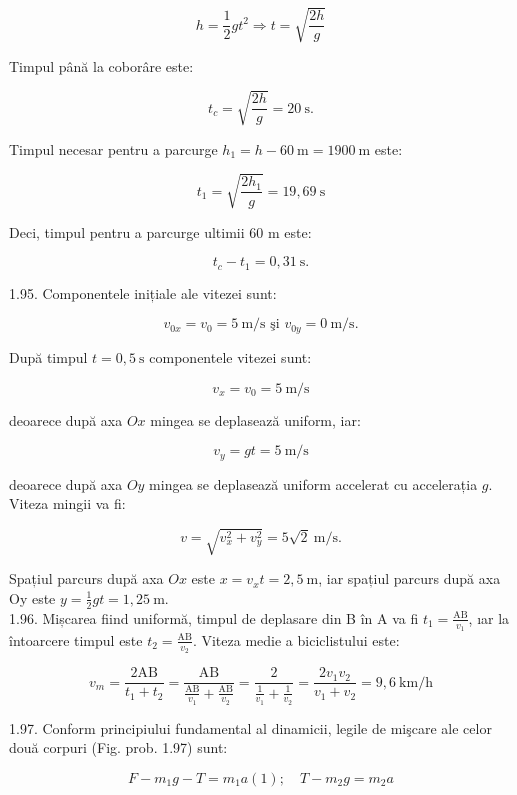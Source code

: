 \documentclass[10pt]{article}
\begin{document}
$$
h=\frac{1}{2} g t^{2} \Rightarrow t=\sqrt{\frac{2 h}{g}}
$$

Timpul până la coborâre este:

$$
t_{c}=\sqrt{\frac{2 h}{g}}=20 \mathrm{~s} .
$$

Timpul necesar pentru a parcurge $h_{1}=h-60 \mathrm{~m}=1900 \mathrm{~m}$ este:

$$
t_{1}=\sqrt{\frac{2 h_{1}}{g}}=19,69 \mathrm{~s}
$$

Deci, timpul pentru a parcurge ultimii 60 m este:

$$
t_{c}-t_{1}=0,31 \mathrm{~s} .
$$

1.95. Componentele inițiale ale vitezei sunt:

$$
v_{0 x}=v_{0}=5 \mathrm{~m} / \mathrm{s} \text { şi } v_{0 y}=0 \mathrm{~m} / \mathrm{s} .
$$

După timpul $t=0,5 \mathrm{~s}$ componentele vitezei sunt:

$$
v_{x}=v_{0}=5 \mathrm{~m} / \mathrm{s}
$$

deoarece după axa $O x$ mingea se deplasează uniform, iar:

$$
v_{y}=g t=5 \mathrm{~m} / \mathrm{s}
$$

deoarece după axa $O y$ mingea se deplasează uniform accelerat cu accelerația $g$.\\
Viteza mingii va fi:

$$
v=\sqrt{v_{x}^{2}+v_{y}^{2}}=5 \sqrt{2} \mathrm{~m} / \mathrm{s} .
$$

Spațiul parcurs după axa $O x$ este $x=v_{x} t=2,5 \mathrm{~m}$, iar spațiul parcurs după axa Oy este $y=\frac{1}{2} g t=1,25 \mathrm{~m}$.\\
1.96. Mișcarea fiind uniformă, timpul de deplasare din B în A va fi $t_{1}=\frac{\mathrm{AB}}{v_{1}}$, ıar la întoarcere timpul este $t_{2}=\frac{\mathrm{AB}}{v_{2}}$. Viteza medie a biciclistului este:

$$
v_{m}=\frac{2 \mathrm{AB}}{t_{1}+t_{2}}=\frac{\mathrm{AB}}{\frac{\mathrm{AB}}{v_{1}}+\frac{\mathrm{AB}}{v_{2}}}=\frac{2}{\frac{1}{v_{1}}+\frac{1}{v_{2}}}=\frac{2 v_{1} v_{2}}{v_{1}+v_{2}}=9,6 \mathrm{~km} / \mathrm{h}
$$

1.97. Conform principiului fundamental al dinamicii, legile de mişcare ale celor două corpuri (Fig. prob. 1.97) sunt:


\begin{equation*}
F-m_{1} g-T=m_{1} a(1) ; \quad T-m_{2} g=m_{2} a \tag{2}
\end{equation*}
\end{document}
